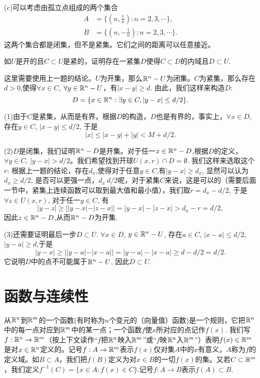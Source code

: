 \begin{problemset}
(c)可以考虑由孤立点组成的两个集合
\[
\begin{aligned}
A &= \{(n, \frac{1}{n}) : n=2,3,\cdots\},\\ 
B &= \{(n, -\frac{1}{n}) : n=2,3,\cdots\}.
\end{aligned}
\]
这两个集合都是闭集，但不是紧集。它们之间的距离可以任意接近。

\item\label{exer009010122} 如$U$是开的且$C \subset U$是紧的，证明存在一紧集$D$使得$C \subset D$的内域且$D \subset U$.

这里需要使用上一题的结论。$U$为开集，那么$\mathbb{R}^n-U$为闭集。$C$为紧集，那么存在$d>0$,使得$\forall x \in C$, $\forall y \in \mathbb{R}^n - U$，有$|x-y| \ge d$. 由此，我们这样来构造$D$:
\[
D = \{x \in \mathbb{R}^n : \exists y \in C, |y-x| \le d / 2\}.
\]

(1)由于$C$是紧集，从而是有界，根据$D$的构造，$D$也是有界的，事实上，$\forall x \in D$,存在$y \in C$, $|x - y| \le d / 2$, 于是
\[
|x| \le |x - y| + |y| < M + d/2.
\]

(2)$D$是闭集，我们证明$\mathbb{R}^n-D$是开集。对于任一$x \in \mathbb{R}^n - D$,根据$D$的定义，$\forall y \in C$, $|y-x| > d / 2$。我们希望找到开球$U(x, r) \cap D = \emptyset$. 我们这样来选取这个$r$: 根据上一题的结论，存在$d_x$,使得对于任意$y \in C$,有$|y-x|\ge d_x$, 显然可以认为$d_x \ge d/2$, 是否可以更强一点，$d_x \> d/2$呢，对于紧集$C$来说，这是可以的（需要后面一节中，紧集上连续函数可以取到最大值和最小值），我们取$r = d_x - d/2$, 于是$\forall z \in U(x, r)$, 对于任一$y \in C$, 有
\[
|y - z| \ge ||y-x| - |z-x|| = |y-x| - |z-x| > d_x - r = d/2,
\]
因此$z \in \mathbb{R}^n - D$,从而$\mathbb{R}^n-D$为开集.

(3)还需要证明最后一步$D \subset U$. $\forall x \in D$, $y \in \mathbb{R}^n - U$, 存在$a \in C$, $|x-a| \le d/2$, $|y - a| \ge d$,于是
\[
|y-x| \ge ||y-a| - |x-a|| = |y-a| - |x-a| \ge d - d/2 = d/2.
\]
它说明$D$中的点不可能属于$\mathbb{R}^n-U$, 因此$D \subset U$.

\end{problemset}



\section{函数与连续性}\label{section0090103}
从$\mathbb{R}^n$到$\mathbb{R}^m$的一个函数(有时称为$n$个变元的（向量值）函数)是一个规则，它把$\mathbb{R}^n$中的每一点对应到$\mathbb{R}^m$中的某一点；一个函数$f$使$x$所对应的点记作$f(x)$. 我们写$f:\mathbb{R}^n \to \mathbb{R}^m$（按上下文读作“$f$把$\mathbb{R}^n$映入$\mathbb{R}^m$”或“$f$映$\mathbb{R}^n$入$\mathbb{R}^m$”）表明$f(x) \in \mathbb{R}^m$是对$x \in \mathbb{R}^n$定义的。记号$f: A \to \mathbb{R}^m$表示$f(x)$仅对集$A$中的$x$有意义，$A$称为$f$的定义域。如$B \subset A$，我们把$f(B)$定义为对$x \in B$的一切$f(x)$的集。又若$C \subset \mathbb{R}^m$，我们定义$f^{-1}(C) = \{x \in A:f(x) \in C\}$.记号$f:A \to B$表示$f(A) \subset B$.

